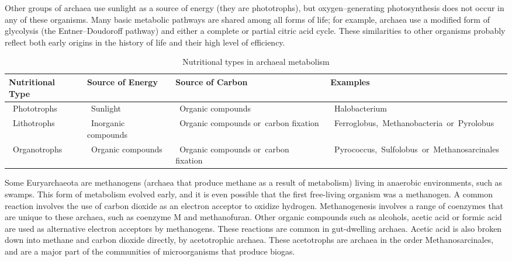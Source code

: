 Other groups of archaea use sunlight as a source of energy (they are phototrophs), but oxygen--generating photosynthesis does not occur in any of these organisms. Many basic metabolic pathways are shared among all forms of life; for example, archaea use a modified form of glycolysis (the Entner--Doudoroff pathway) and either a complete or partial citric acid cycle. These similarities to other organisms probably reflect both early origins in the history of life and their high level of efficiency.

\onecolumn
\begin{table}

\caption{\label{tab:archaeametabo}Nutritional types in archaeal metabolism}
\centering
\begin{tabular}[t]{>{\raggedright\arraybackslash}p{5em}>{\raggedright\arraybackslash}p{10em}>{\raggedright\arraybackslash}p{20em}>{\raggedright\arraybackslash}p{30em}}
\toprule
Nutritional Type & Source of Energy & Source of Carbon & Examples\\
\midrule
\rowcolor{gray!6}   Phototrophs  &  Sunlight  &  Organic compounds  &  Halobacterium \\
 Lithotrophs &  Inorganic compounds &  Organic compounds or carbon fixation &  Ferroglobus, Methanobacteria or Pyrolobus \\
\rowcolor{gray!6}   Organotrophs &  Organic compounds  &  Organic compounds or carbon fixation  &  Pyrococcus, Sulfolobus or Methanosarcinales \\
\bottomrule
\end{tabular}
\end{table}

\twocolumn

Some Euryarchaeota are methanogens (archaea that produce methane as a result of metabolism) living in anaerobic environments, such as swamps. This form of metabolism evolved early, and it is even possible that the first free-living organism was a methanogen. A common reaction involves the use of carbon dioxide as an electron acceptor to oxidize hydrogen. Methanogenesis involves a range of coenzymes that are unique to these archaea, such as coenzyme M and methanofuran. Other organic compounds such as alcohols, acetic acid or formic acid are used as alternative electron acceptors by methanogens. These reactions are common in gut-dwelling archaea. Acetic acid is also broken down into methane and carbon dioxide directly, by acetotrophic archaea. These acetotrophs are archaea in the order Methanosarcinales, and are a major part of the communities of microorganisms that produce biogas.

